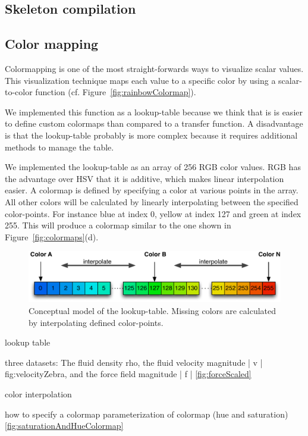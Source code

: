 \subsection{Skeleton compilation}

\subsection{Color mapping}
Colormapping is one of the most straight-forwards ways to visualize scalar values. This visualization technique maps each value to a specific color by using a scalar-to-color function (cf. Figure~\ref{fig:rainbowColormap}). 

We implemented this function as a lookup-table because we think that is is easier to define custom colormaps than compared to a transfer function. A disadvantage is that the lookup-table probably is more complex because it requires additional methods to manage the table.

We implemented the lookup-table as an array of 256 RGB color values. RGB has the advantage over HSV that it is additive, which makes linear interpolation easier. A colormap is defined by specifying a color at various points in the array. All other colors will be calculated by linearly interpolating between the specified color-points. For instance blue at index 0, yellow at index 127 and green at index 255. This will produce a colormap similar to the one shown in Figure~\ref{fig:colormaps}(d). 


\begin{figure}[htbp]
    \centering
    \includegraphics[width=.8\textwidth]{figures/colormaps/lookuptable.pdf}
    \caption{Conceptual model of the lookup-table. Missing colors are calculated by interpolating defined color-points.}
    \label{fig:lookupTable}
\end{figure}



lookup table


three datasets: The fluid density rho, the fluid velocity magnitude | v | fig:velocityZebra, and the force field magnitude | f | \ref{fig:forceScaled}


color interpolation

how to specify a colormap
parameterization of colormap (hue and saturation) \ref{fig:saturationAndHueColormap}

